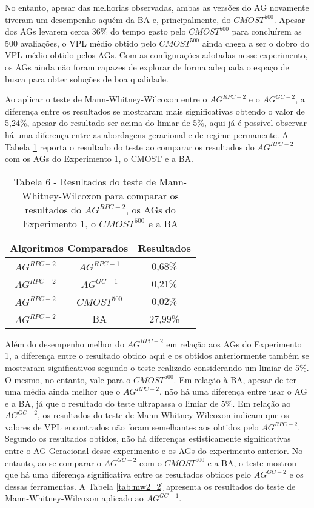 No entanto, apesar das melhorias observadas, ambas as versões do AG novamente tiveram um desempenho aquém da BA e, principalmente, do $CMOST^500$. Apesar dos AGs levarem cerca 36\% do tempo gasto pelo $CMOST^500$ para concluírem as 500 avaliações, o VPL médio obtido pelo $CMOST^500$ ainda chega a ser o dobro do VPL médio obtido pelos AGs. Com as configurações adotadas nesse experimento, os AGs ainda não foram capazes de explorar de forma adequada o espaço de busca para obter soluções de boa qualidade. 

Ao aplicar o teste de Mann-Whitney-Wilcoxon entre o $AG^{RPC-2}$ e o $AG^{GC-2}$, a diferença entre os resultados se mostraram mais significativas obtendo o valor de 5,24\%, apesar do resultado ser acima do limiar de 5\%, aqui já é possível observar há uma diferença entre as abordagens geracional e de regime permanente. A Tabela \ref{tab:mw2_1} reporta o resultado do teste ao comparar os resultados do $AG^{RPC-2}$ com os AGs do Experimento 1, o CMOST e a BA. 

\begin{table}[H]
\centering
\caption{Tabela 6 - Resultados do teste de Mann-Whitney-Wilcoxon para comparar os resultados do $AG^{RPC-2}$, os AGs do Experimento 1, o $CMOST^{500}$ e a BA}
\label{tab:mw2_1}
\begin{tabular}{|c|c|c|}
\hline
\multicolumn{2}{|c|}{Algoritmos Comparados} & Resultados \\ \hline
$AG^{RPC-2}$ & $AG^{RPC-1}$ & 0,68\% \\ \hline
$AG^{RPC-2}$ & $AG^{GC-1}$ & 0,21\% \\ \hline
$AG^{RPC-2}$ & $CMOST^500$ & 0,02\% \\ \hline
$AG^{RPC-2}$ & BA & 27,99\% \\ \hline
\end{tabular}
\end{table}

Além do desempenho melhor do $AG^{RPC-2}$ em relação aos AGs do Experimento 1, a diferença entre o resultado obtido aqui e os obtidos anteriormente também se mostraram significativos segundo o teste realizado considerando um limiar de 5\%. O mesmo, no entanto, vale para o $CMOST^{500}$. Em relação à BA, apesar de ter uma média ainda melhor que o $AG^{RPC-2}$, não há uma diferença entre usar o AG e a BA, já que o resultado do teste ultrapassa o limiar de 5\%. Em relação ao $AG^{GC-2}$, os resultados do teste de Mann-Whitney-Wilcoxon indicam que os valores de VPL encontrados não foram semelhantes aos obtidos pelo $AG^{RPC-2}$. Segundo os resultados obtidos, não há diferenças estisticamente significativas entre o AG Geracional desse experimento e os AGs do experimento anterior. No entanto, ao se comparar o $AG^{GC-2}$ com o $CMOST^{500}$ e a BA, o teste mostrou que há uma diferença significativa entre os resultados obtidos pelo $AG^{GC-2}$ e os dessas ferramentas. A Tabela \ref{tab:mw2_2} apresenta os resultados do teste de Mann-Whitney-Wilcoxon aplicado ao $AG^{GC-1}$.

